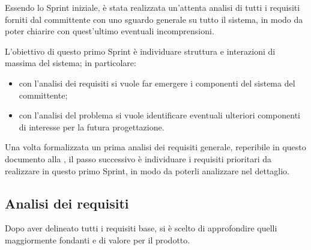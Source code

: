 

Essendo lo Sprint iniziale, è stata realizzata un'attenta analisi di tutti i requisiti forniti dal committente
con uno sguardo generale su tutto il sistema, in modo da poter chiarire con quest'ultimo eventuali incomprensioni.

L'obiettivo di questo primo Sprint è individuare struttura e interazioni di massima del sistema; in particolare:
\begin{itemize}
  \item
    con l'analisi dei requisiti si vuole far emergere i componenti del sistema del committente;
  \item
    con l'analisi del problema si vuole identificare eventuali ulteriori componenti di interesse per la futura progettazione.
\end{itemize}

Una volta formalizzata un prima analisi dei requisiti generale, reperibile in questo documento alla ,
il passo successivo è individuare i requisiti prioritari da realizzare in questo primo Sprint, in modo da poterli analizzare nel dettaglio.

\subsection{Analisi dei requisiti}

Dopo aver delineato tutti i requisiti base, si è scelto di approfondire quelli maggiormente fondanti e di valore per il prodotto.


